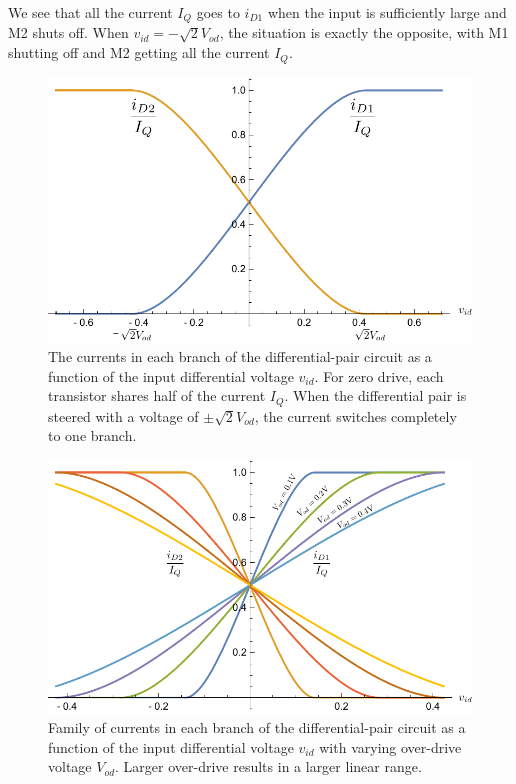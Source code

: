 We see that all the current $I_Q$ goes to $i_{D1}$ when the input is sufficiently large and M2 shuts off.  When $v_{id} = - \sqrt{2} V_{od}$, the situation is exactly the opposite, with M1 shutting off and M2 getting all the current $I_Q$.
\begin{figure}[tb]
\centering
\includegraphics[width=.7\columnwidth]{mosdiffamp_id}
\caption{The currents in each branch of the differential-pair circuit as a function of the input differential voltage $v_{id}$.  For zero drive, each transistor shares half of the current $I_Q$.  When the differential pair is steered with a voltage of $\pm \sqrt{2} V_{od}$, the current switches completely to one branch.}
\label{fig:mosdiffamp_id}
\end{figure}
\begin{figure}[tb]
\centering
\includegraphics[width=.7\columnwidth]{mosdiffamp_id_od}
\caption{Family of currents in each branch of the differential-pair circuit as a function of the input differential voltage $v_{id}$ with varying over-drive voltage $V_{od}$.  Larger over-drive results in a larger linear range.}
\label{fig:mosdiffamp_id_od}
\end{figure}
